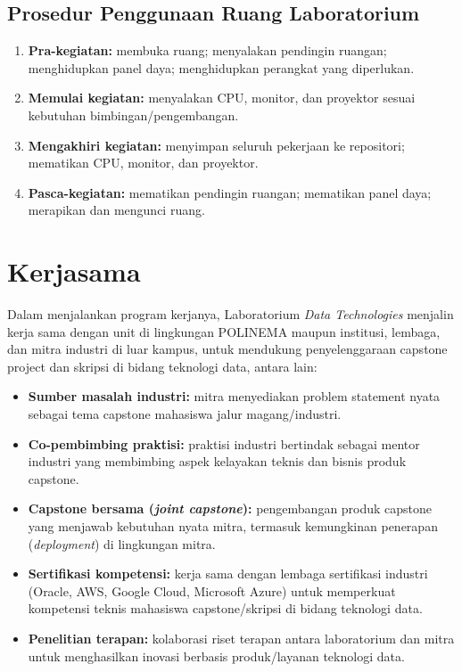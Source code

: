 \documentclass[12pt,a4paper]{report}
\begin{document}
\section{Prosedur Penggunaan Ruang Laboratorium}
\begin{enumerate}
\item \textbf{Pra-kegiatan:} membuka ruang; menyalakan pendingin ruangan; menghidupkan panel daya; menghidupkan perangkat yang diperlukan.
\item \textbf{Memulai kegiatan:} menyalakan CPU, monitor, dan proyektor sesuai kebutuhan bimbingan/pengembangan.
\item \textbf{Mengakhiri kegiatan:} menyimpan seluruh pekerjaan ke repositori; mematikan CPU, monitor, dan proyektor.
\item \textbf{Pasca-kegiatan:} mematikan pendingin ruangan; mematikan panel daya; merapikan dan mengunci ruang.
\end{enumerate}

\chapter{Kerjasama}

Dalam menjalankan program kerjanya, Laboratorium \emph{Data Technologies} menjalin kerja sama dengan unit di lingkungan POLINEMA maupun institusi, lembaga, dan mitra industri di luar kampus, untuk mendukung penyelenggaraan capstone project dan skripsi di bidang teknologi data, antara lain:
\begin{itemize}
\item \textbf{Sumber masalah industri:} mitra menyediakan problem statement nyata sebagai tema capstone mahasiswa jalur magang/industri.
\item \textbf{Co-pembimbing praktisi:} praktisi industri bertindak sebagai mentor industri yang membimbing aspek kelayakan teknis dan bisnis produk capstone.
\item \textbf{Capstone bersama (\emph{joint capstone}):} pengembangan produk capstone yang menjawab kebutuhan nyata mitra, termasuk kemungkinan penerapan (\emph{deployment}) di lingkungan mitra.
\item \textbf{Sertifikasi kompetensi:} kerja sama dengan lembaga sertifikasi industri (Oracle, AWS, Google Cloud, Microsoft Azure) untuk memperkuat kompetensi teknis mahasiswa capstone/skripsi di bidang teknologi data.
\item \textbf{Penelitian terapan:} kolaborasi riset terapan antara laboratorium dan mitra untuk menghasilkan inovasi berbasis produk/layanan teknologi data.
\end{itemize}

\PedomanPengesahan
\end{document}

